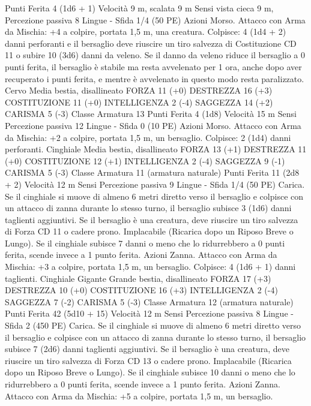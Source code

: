 \begin{multicols}{2}
Punti Ferita 4 (1d6 + 1)
Velocità 9 m, scalata 9 m
Sensi vista cieca 9 m, Percezione passiva 8
Lingue -
Sfida 1/4 (50 PE)
Azioni
Morso. Attacco con Arma da Mischia: +4 a colpire, portata 1,5
m, una creatura.
Colpisce: 4 (1d4 + 2) danni perforanti e il bersaglio deve riuscire
un tiro salvezza di Costituzione CD 11 o subire 10 (3d6) danni
da veleno. Se il danno da veleno riduce il bersaglio a 0 punti
ferita, il bersaglio è stabile ma resta avvelenato per 1 ora, anche
dopo aver recuperato i punti ferita, e mentre è avvelenato in
questo modo resta paralizzato.
Cervo
Media bestia, disallineato
FORZA 11 (+0)
DESTREZZA 16 (+3)
COSTITUZIONE 11 (+0)
INTELLIGENZA 2 (-4)
SAGGEZZA 14 (+2)
CARISMA 5 (-3)
Classe Armatura 13
Punti Ferita 4 (1d8)
Velocità 15 m
Sensi Percezione passiva 12
Lingue -
Sfida 0 (10 PE)
Azioni
Morso. Attacco con Arma da Mischia: +2 a colpire, portata 1,5
m, un bersaglio.
Colpisce: 2 (1d4) danni perforanti.
Cinghiale
Media bestia, disallineato
FORZA 13 (+1)
DESTREZZA 11 (+0)
COSTITUZIONE 12 (+1)
INTELLIGENZA 2 (-4)
SAGGEZZA 9 (-1)
CARISMA 5 (-3)
Classe Armatura 11 (armatura naturale)
Punti Ferita 11 (2d8 + 2)
Velocità 12 m
Sensi Percezione passiva 9
Lingue -
Sfida 1/4 (50 PE)
Carica. Se il cinghiale si muove di almeno 6 metri diretto verso
il bersaglio e colpisce con un attacco di zanna durante lo stesso
turno, il bersaglio subisce 3 (1d6) danni taglienti aggiuntivi. Se il
bersaglio è una creatura, deve riuscire un tiro salvezza di Forza
CD 11 o cadere prono.
Implacabile (Ricarica dopo un Riposo Breve o Lungo). Se il
cinghiale subisce 7 danni o meno che lo ridurrebbero a 0 punti
ferita, scende invece a 1 punto ferita.
Azioni
Zanna. Attacco con Arma da Mischia: +3 a colpire, portata 1,5
m, un bersaglio.
Colpisce: 4 (1d6 + 1) danni taglienti.
Cinghiale Gigante
Grande bestia, disallineato
FORZA 17 (+3)
DESTREZZA 10 (+0)
COSTITUZIONE 16 (+3)
INTELLIGENZA 2 (-4)
SAGGEZZA 7 (-2)
CARISMA 5 (-3)
Classe Armatura 12 (armatura naturale)
Punti Ferita 42 (5d10 + 15)
Velocità 12 m
Sensi Percezione passiva 8
Lingue -
Sfida 2 (450 PE)
Carica. Se il cinghiale si muove di almeno 6 metri diretto verso
il bersaglio e colpisce con un attacco di zanna durante lo stesso
turno, il bersaglio subisce 7 (2d6) danni taglienti aggiuntivi. Se il
bersaglio è una creatura, deve riuscire un tiro salvezza di Forza
CD 13 o cadere prono.
Implacabile (Ricarica dopo un Riposo Breve o Lungo). Se il
cinghiale subisce 10 danni o meno che lo ridurrebbero a 0 punti
ferita, scende invece a 1 punto ferita.
Azioni
Zanna. Attacco con Arma da Mischia: +5 a colpire, portata 1,5
m, un bersaglio.

\end{multicols}
